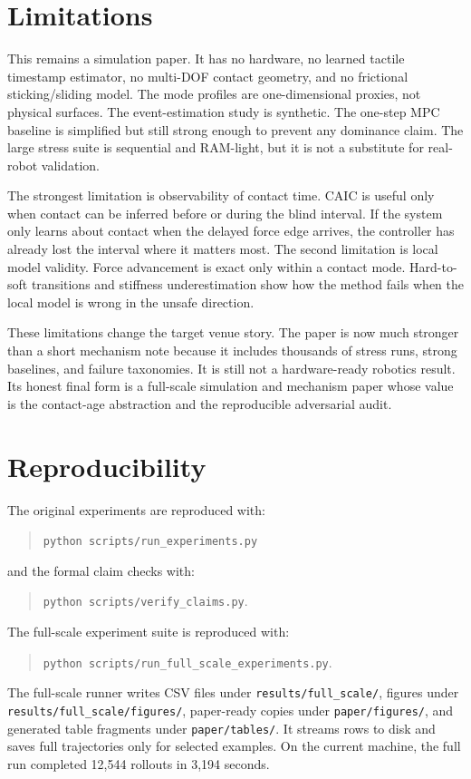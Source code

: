 \documentclass{article}
\newcommand{\caic}{CAIC}
\begin{document}
\section{Limitations}

This remains a simulation paper. It has no hardware, no learned tactile timestamp estimator, no multi-DOF contact geometry, and no frictional sticking/sliding model. The mode profiles are one-dimensional proxies, not physical surfaces. The event-estimation study is synthetic. The one-step MPC baseline is simplified but still strong enough to prevent any dominance claim. The large stress suite is sequential and RAM-light, but it is not a substitute for real-robot validation.

The strongest limitation is observability of contact time. \caic{} is useful only when contact can be inferred before or during the blind interval. If the system only learns about contact when the delayed force edge arrives, the controller has already lost the interval where it matters most. The second limitation is local model validity. Force advancement is exact only within a contact mode. Hard-to-soft transitions and stiffness underestimation show how the method fails when the local model is wrong in the unsafe direction.

These limitations change the target venue story. The paper is now much stronger than a short mechanism note because it includes thousands of stress runs, strong baselines, and failure taxonomies. It is still not a hardware-ready robotics result. Its honest final form is a full-scale simulation and mechanism paper whose value is the contact-age abstraction and the reproducible adversarial audit.

\section{Reproducibility}

The original experiments are reproduced with:
\begin{quote}
\texttt{python scripts/run\_experiments.py}
\end{quote}
and the formal claim checks with:
\begin{quote}
\texttt{python scripts/verify\_claims.py}.
\end{quote}
The full-scale experiment suite is reproduced with:
\begin{quote}
\texttt{python scripts/run\_full\_scale\_experiments.py}.
\end{quote}
The full-scale runner writes CSV files under \texttt{results/full\_scale/}, figures under \texttt{results/full\_scale/figures/}, paper-ready copies under \texttt{paper/figures/}, and generated table fragments under \texttt{paper/tables/}. It streams rows to disk and saves full trajectories only for selected examples. On the current machine, the full run completed 12,544 rollouts in 3,194 seconds.
\end{document}
